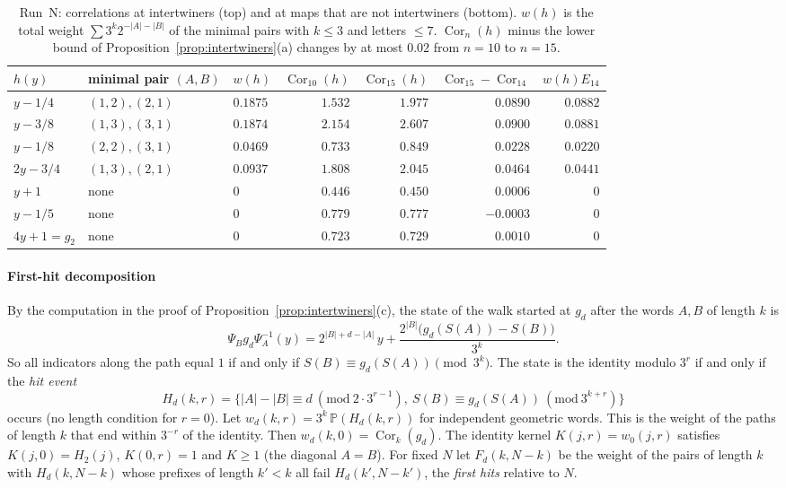 \documentclass[12pt]{amsart}
\theoremstyle{definition}
\theoremstyle{remark}
\begin{document}
\begin{table}[tp]
\centering
\small
\begin{tabular}{@{}lllrrrr@{}}
\toprule
$h(y)$ & minimal pair $(A,B)$ & $w(h)$ & $\operatorname{Cor}_{10}(h)$ & $\operatorname{Cor}_{15}(h)$ & $\operatorname{Cor}_{15}-\operatorname{Cor}_{14}$ & $w(h)E_{14}$\\
\midrule
$y-1/4$ & $(1,2),(2,1)$ & $0.1875$ & $1.532$ & $1.977$ & $0.0890$ & $0.0882$\\
$y-3/8$ & $(1,3),(3,1)$ & $0.1874$ & $2.154$ & $2.607$ & $0.0900$ & $0.0881$\\
$y-1/8$ & $(2,2),(3,1)$ & $0.0469$ & $0.733$ & $0.849$ & $0.0228$ & $0.0220$\\
$2y-3/4$ & $(1,3),(2,1)$ & $0.0937$ & $1.808$ & $2.045$ & $0.0464$ & $0.0441$\\
\midrule
$y+1$ & none & $0$ & $0.446$ & $0.450$ & $0.0006$ & $0$\\
$y-1/5$ & none & $0$ & $0.779$ & $0.777$ & $-0.0003$ & $0$\\
$4y+1=g_2$ & none & $0$ & $0.723$ & $0.729$ & $0.0010$ & $0$\\
\bottomrule
\end{tabular}
\caption{Run~N: correlations at intertwiners (top) and at maps that are not intertwiners (bottom). $w(h)$ is the total weight $\sum3^k2^{-|A|-|B|}$ of the minimal pairs with $k\le3$ and letters $\le7$. $\operatorname{Cor}_n(h)$ minus the lower bound of Proposition~\ref{prop:intertwiners}(a) changes by at most $0.02$ from $n=10$ to $n=15$.}
\label{table:syr-singular}
\end{table}

\paragraph{First-hit decomposition} By the computation in the proof of Proposition~\ref{prop:intertwiners}(c), the state of the walk started at $g_d$ after the words $A,B$ of length $k$ is
\[
 \Psi_Bg_d\Psi_A^{-1}(y)=2^{|B|+d-|A|}\,y+\frac{2^{|B|}\bigl(g_d(S(A))-S(B)\bigr)}{3^k} .
\]
So all indicators along the path equal $1$ if and only if $S(B)\equiv g_d(S(A))\pmod{3^k}$. The state is the identity modulo $3^r$ if and only if the \emph{hit event}
\[
 H_d(k,r)=\bigl\{|A|-|B|\equiv d\ (\mathrm{mod}\ 2\cdot3^{r-1}),\ S(B)\equiv g_d(S(A))\ (\mathrm{mod}\ 3^{k+r})\bigr\}
\]
occurs (no length condition for $r=0$). Let $w_d(k,r)=3^k\,\mathbb P(H_d(k,r))$ for independent geometric words. This is the weight of the paths of length $k$ that end within $3^{-r}$ of the identity. Then $w_d(k,0)=\operatorname{Cor}_k(g_d)$. The identity kernel $K(j,r)=w_0(j,r)$ satisfies $K(j,0)=H_2(j)$, $K(0,r)=1$ and $K\ge1$ (the diagonal $A=B$). For fixed $N$ let $F_d(k,N-k)$ be the weight of the pairs of length $k$ with $H_d(k,N-k)$ whose prefixes of length $k'<k$ all fail $H_d(k',N-k')$, the \emph{first hits} relative to $N$.
\end{document}
